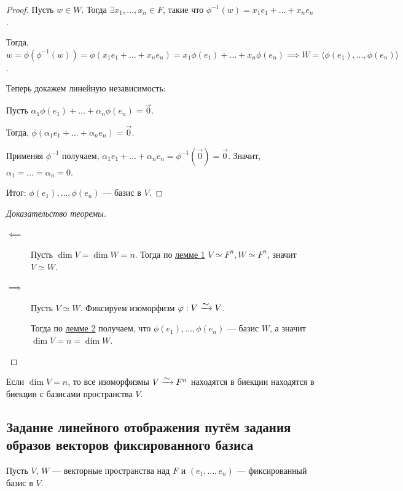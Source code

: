\begin{proof}
    Пусть $w \in W$. Тогда $\exists x_1, \dots, x_n \in F$, такие что $\phi^{-1}(w) = x_1 e_1 + \dots + x_n e_n$.

    Тогда, $w = \phi\left(\phi^{-1}(w)\right) = \phi(x_1 e_1 + \dots + x_n e_n) = x_1 \phi(e_1) + \dots + x_n \phi(e_n) \implies W = \langle \phi(e_1), \dots, \phi(e_n) \rangle$.

    Теперь докажем линейную независимость:

    Пусть $\alpha_1 \phi(e_1) + \dots + \alpha_n \phi(e_n) = \overrightarrow{0}$.

    Тогда, $\phi(\alpha_1 e_1 + \dots + \alpha_n e_n) = \overrightarrow{0}$.

    Применяя $\phi^{-1}$ получаем, $\alpha_1 e_1 + \dots + \alpha_n e_n = \phi^{-1}(\overrightarrow{0}) = \overrightarrow{0}$. Значит, $\alpha_1 = \dots = \alpha_n = 0$.

    Итог: $\phi(e_1), \dots, \phi(e_n)$ --- базис в $V$.
\end{proof}

\begin{proof}[Доказательство теоремы]~
    \begin{description}
    \item[$\impliedby$] Пусть $\dim V= \dim W = n$. Тогда по \hyperref[lec16:lemma_1]{лемме 1} $V \simeq F^n, W \simeq F^n$, значит $V \simeq W$.
    \item[$\implies$] Пусть $V \simeq W$. Фиксируем изоморфизм $\phi : V \MapsTo V$.

        Тогда по \hyperref[lec16:lemma_2]{лемме 2} получаем, что $\phi(e_1), \dots, \phi(e_n)$ --- базис $W$, а значит $\dim V = n = \dim W$.
        \qedhere
    \end{description}
\end{proof}

\begin{exercise}
    Если $\dim V = n$, то все изоморфизмы $V \MapsTo F^n$ находятся в биекции находятся в биекции с базисами пространства $V$.
\end{exercise}


\subsection{Задание линейного отображения путём задания образов векторов фиксированного базиса}

Пусть $V$, $W$ --- векторные пространства над $F$ и $(e_1, \dots, e_n)$ --- фиксированный базис в $V$.

